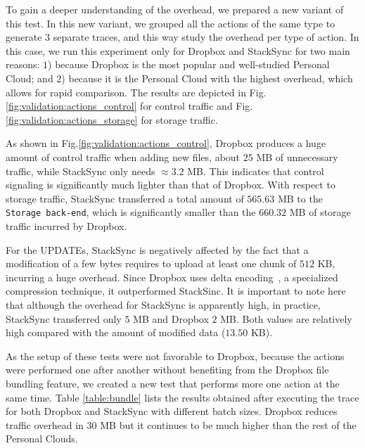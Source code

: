 To gain a deeper understanding of the overhead, we prepared a new variant of
this test. In this new variant, we grouped all the actions of the same type to generate $3$ separate traces,
and this way study the overhead per type of action. In this case, we run this experiment only for Dropbox and StackSync
for two main reasons: $1$) because 
Dropbox is the most popular and well-studied Personal Cloud; and $2$) because
it is the Personal Cloud with the highest overhead, which allows for rapid comparison. 
The results are depicted in Fig.\ref{fig:validation:actions_control} for control traffic and Fig.\ref{fig:validation:actions_storage}
for storage traffic.

As shown in Fig.\ref{fig:validation:actions_control}, Dropbox produces a huge amount of control traffic
when adding new files, about $25$ MB of unnecessary traffic, while StackSync only needs $\approx 3.2$ MB.
This indicates that control signaling is significantly much lighter than that of Dropbox. With respect
to storage traffic, StackSync transferred a total amount of $565.63$ MB to the \texttt{Storage back-end},
which is significantly smaller than the $660.32$ MB of storage traffic incurred by Dropbox.

For the UPDATEs, StackSync is negatively affected by the fact that a modification of a few bytes requires to upload at 
least one chunk of  $512$ KB, incurring a huge overhead. Since Dropbox uses delta encoding~\cite{drago2013benchmarking}, a specialized
compression technique, it outperformed StackSinc. It is important to note here that although the 
overhead for StackSync is apparently high, in practice, StackSync transferred only $5$ MB and Dropbox $2$ MB. 
Both values are relatively high compared with the amount of  modified data ($13.50$ KB). 

As the setup of these tests were not favorable to Dropbox, because the actions were performed one after
another without benefiting from the Dropbox file bundling feature, we created a new test that
performs more one action at the same time. Table \ref{table:bundle} lists
the results obtained after executing the trace for both Dropbox and StackSync with different
batch sizes. Dropbox reduces traffic overhead in $30$ MB but it continues to be much higher than the
rest of the Personal Clouds.

